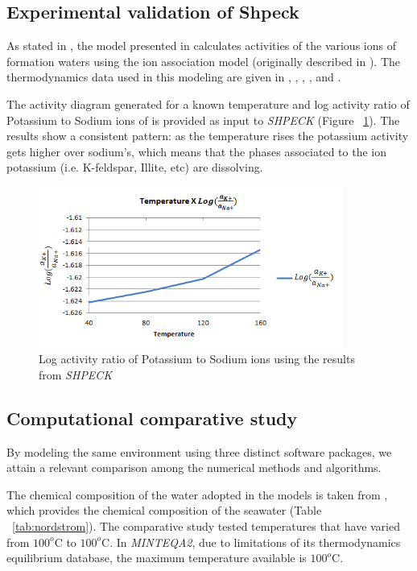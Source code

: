 \subsection{Experimental validation of Shpeck}
As stated in \cite{Morad:90}, the model presented in \cite{Egeberg:88} calculates activities of the various ions of formation waters using the ion association model (originally described in \cite{Wigley:77}). The thermodynamics data used in this modeling are given in \cite{Helgeson:74a},  \cite{Helgeson:74b}, \cite{Helgeson:76}, \cite{Waltter:77}, \cite{Helgeson:78} and \cite{Helgeson:81}.


The activity diagram generated for a known temperature and log activity ratio of Potassium to Sodium ions of \cite{Aagaard:90}  is provided as input to \emph{SHPECK} (Figure ~\ref{fig:tempXactratio}). The results show a consistent pattern: as the temperature rises the potassium activity gets higher over sodium’s, which means that the phases associated to the ion potassium (i.e. K-feldspar, Illite, etc) are dissolving.


\begin{figure}[ht!]
\centering
\includegraphics[width=100mm]{figures/tempXactratio.png}
\caption{Log activity ratio of Potassium to Sodium ions using the results from \emph{SHPECK}}
\label{fig:tempXactratio}
\end{figure}



\subsection{Computational comparative study} 
By modeling the same environment using three distinct software packages, we attain a relevant comparison among the numerical methods and algorithms. 


The chemical composition of the water adopted in the models is taken from  \cite{Nordstrom:79}, which provides the chemical composition of the seawater (Table ~\ref{tab:nordstrom}). The comparative study tested temperatures that have varied from $100^o$C to $100^o$C. In \emph{MINTEQA2}, due to limitations of its thermodynamics equilibrium database, the maximum temperature available is $100^o$C.

